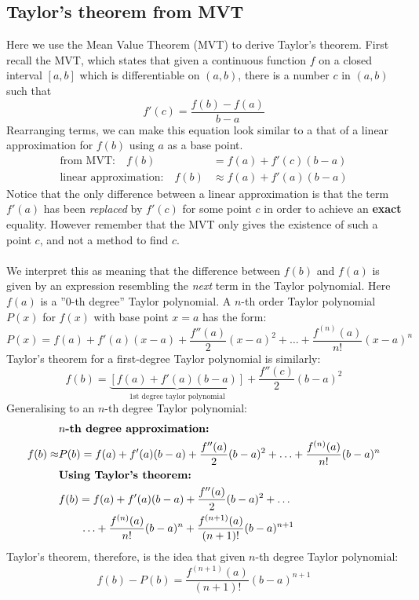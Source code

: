 \documentclass{report}
\begin{document}
\subsection{Taylor's theorem from MVT} %
Here we use the Mean Value Theorem (MVT) to derive Taylor's theorem. First recall
the MVT, which states that given a continuous function $f$ on a closed interval $[a,b]$
which is differentiable on $(a,b)$, there is a number $c$ in $(a,b)$ such that 
\begin{equation*}
f'(c)=\frac{f(b)-f(a)}{b-a}
\end{equation*}
Rearranging terms, we can make this equation look similar to a that of a linear approximation
for $f(b)$ using $a$ as a base point. 
\begin{align*}
\text{from MVT:}\quad f(b)&=f(a)+f'(c)(b-a)\\
\text{linear approximation:}\quad f(b)&\approx f(a)+f'(a)(b-a)
\end{align*}
Notice that the only difference between a linear approximation is that the term $f'(a)$  
has been \textit{replaced} by $f'(c)$ for some point $c$ in order to achieve an \textbf{exact}
equality. However remember that the MVT only gives the existence of such a point $c$, 
and not a method to find $c$.\\
\vspace{1mm}\\
We interpret this as meaning that the difference between $f(b)$ and $f(a)$ is given by 
an expression resembling the \textit{next} term in the Taylor polynomial.
Here $f(a)$ is a ''0-th degree'' Taylor polynomial. A $n$-th order Taylor polynomial $P(x)$ for $f(x)$ 
with base point $x=a$ has the form:
\begin{equation*}
P(x)=f(a)+f'(a)(x-a)+\frac{f''(a)}{2}(x-a)^2+\ldots
+\frac{f^{(n)}(a)}{n!}(x-a)^n
\end{equation*}
Taylor's theorem for a first-degree Taylor polynomial is similarly:
\begin{equation*}
f(b)=\underbrace{[f(a)+f'(a)(b-a)]}_{\text{1st degree taylor polynomial}}
+\frac{f''(c)}{2}(b-a)^2
\end{equation*}
Generalising to an $n$-th degree Taylor polynomial:
\begin{align*}
&\text{\textbf{$n$-th degree approximation:}}\\
f(b)\approx&P(b)=f(a)+f'(a)(b-a)+\frac{f''(a)}{2}(b-a)^2
+\ldots+\frac{f^{(n)}(a)}{n!}(b-a)^n\\
&\text{\textbf{Using Taylor's theorem:}}\\
&f(b)=f(a)+f'(a)(b-a)+\frac{f''(a)}{2}(b-a)^2
+\ldots\\
&\quad\quad\ldots+\frac{f^{(n)}(a)}{n!}(b-a)^n+
\frac{f^{(n+1)}(a)}{(n+1)!}(b-a)^{n+1}
\end{align*}
Taylor's theorem, therefore, is the idea that given $n$-th degree Taylor polynomial:
\begin{equation*}
f(b)-P(b)=\frac{f^{(n+1)}(a)}{(n+1)!}(b-a)^{n+1}
\end{equation*}
\newpage
\end{document}
